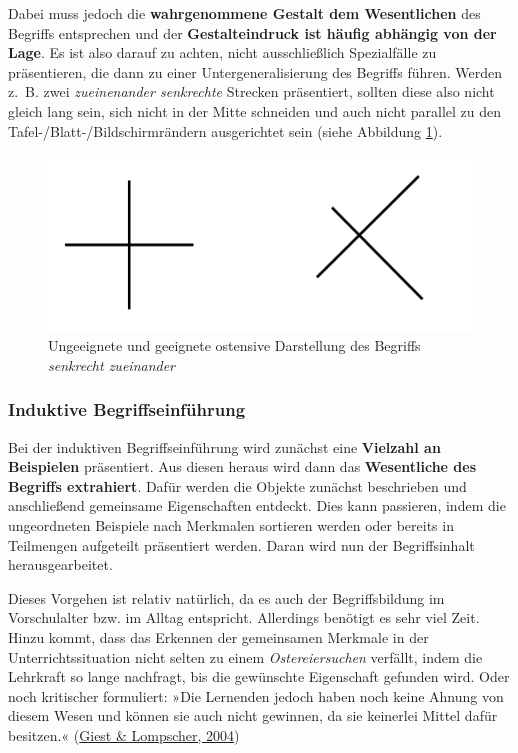 \documentclass[
  ngerman,
]{scrbook}
\theoremstyle{definition}
\theoremstyle{definition}
\theoremstyle{definition}
\theoremstyle{definition}
\theoremstyle{remark}
\begin{document}
Dabei muss jedoch die \textbf{wahrgenommene Gestalt dem Wesentlichen} des Begriffs entsprechen und der \textbf{Gestalteindruck ist häufig abhängig von der Lage}. Es ist also darauf zu achten, nicht ausschließlich Spezialfälle zu präsentieren, die dann zu einer Untergeneralisierung des Begriffs führen. Werden z.~B. zwei \emph{zueinenander senkrechte} Strecken präsentiert, sollten diese also nicht gleich lang sein, sich nicht in der Mitte schneiden und auch nicht parallel zu den Tafel-/Blatt-/Bildschirmrändern ausgerichtet sein (siehe Abbildung \ref{fig:SenkrechtOstensiv}).



\begin{figure}

{\centering \includegraphics[width=0.5\linewidth]{pictures/6-senkrecht} 

}

\caption{Ungeeignete und geeignete ostensive Darstellung des Begriffs \emph{senkrecht zueinander}}\label{fig:SenkrechtOstensiv}
\end{figure}

\hypertarget{induktive-begriffseinfuxfchrung}{%
\subsubsection{Induktive Begriffseinführung}\label{induktive-begriffseinfuxfchrung}}

Bei der induktiven Begriffseinführung wird zunächst eine \textbf{Vielzahl an Beispielen} präsentiert. Aus diesen heraus wird dann das \textbf{Wesentliche des Begriffs extrahiert}. Dafür werden die Objekte zunächst beschrieben und anschließend gemeinsame Eigenschaften entdeckt. Dies kann passieren, indem die ungeordneten Beispiele nach Merkmalen sortieren werden oder bereits in Teilmengen aufgeteilt präsentiert werden. Daran wird nun der Begriffsinhalt herausgearbeitet.

Dieses Vorgehen ist relativ natürlich, da es auch der Begriffsbildung im Vorschulalter bzw. im Alltag entspricht. Allerdings benötigt es sehr viel Zeit. Hinzu kommt, dass das Erkennen der gemeinsamen Merkmale in der Unterrichtssituation nicht selten zu einem \emph{Ostereiersuchen} verfällt, indem die Lehrkraft so lange nachfragt, bis die gewünschte Eigenschaft gefunden wird. Oder noch kritischer formuliert: »Die Lernenden jedoch haben noch keine Ahnung von diesem Wesen und können sie auch nicht gewinnen, da sie keinerlei Mittel dafür besitzen.« (\protect\hyperlink{ref-Giest2004a}{Giest \& Lompscher, 2004})
\end{document}
